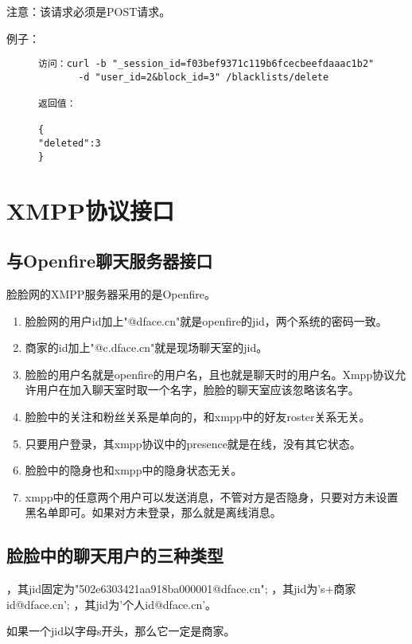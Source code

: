\documentclass[cs4size]{ctexartutf8}
\begin{document}
注意：该请求必须是POST请求。

例子：

\begin{figure}[H]
\begin{verbatim}
访问：curl -b "_session_id=f03bef9371c119b6fcecbeefdaaac1b2"
       -d "user_id=2&block_id=3" /blacklists/delete

返回值：

{
"deleted":3
}

\end{verbatim}
\end{figure}




\section{XMPP协议接口}


\subsection{与Openfire聊天服务器接口}
脸脸网的XMPP服务器采用的是Openfire。

\begin{enumerate}
\item 脸脸网的用户id加上"@dface.cn"就是openfire的jid，两个系统的密码一致。
\item 商家的id加上"@c.dface.cn"就是现场聊天室的jid。
\item 脸脸的用户名就是openfire的用户名，且也就是聊天时的用户名。Xmpp协议允许用户在加入聊天室时取一个名字，脸脸的聊天室应该忽略该名字。
\item 脸脸中的关注和粉丝关系是单向的，和xmpp中的好友roster关系无关。
\item 只要用户登录，其xmpp协议中的presence就是在线，没有其它状态。
\item 脸脸中的隐身也和xmpp中的隐身状态无关。
\item xmpp中的任意两个用户可以发送消息，不管对方是否隐身，只要对方未设置黑名单即可。如果对方未登录，那么就是离线消息。
\end{enumerate}


\subsection{脸脸中的聊天用户的三种类型}

\begin{enumerate}
，其jid固定为"502e6303421aa918ba000001@dface.cn";
，其jid为's+商家id@dface.cn';
，其jid为'个人id@dface.cn'。
\end{enumerate}
如果一个jid以字母s开头，那么它一定是商家。
\end{document}
